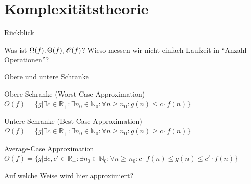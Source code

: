 \def\tutdate{26.01.2017}


\section{Komplexitätstheorie}
\begin{frame}{Rückblick}
	\begin{itemize}
		\pitem Was ist $\Omega(f), \Theta(f), \mathscr{O}(f)$?
		\pitem Wieso messen wir nicht einfach Laufzeit in ``Anzahl Operationen''?
	\end{itemize}
\end{frame}

\begin{frame}{Obere und untere Schranke}
	\begin{block}{Obere Schranke (Worst-Case Approximation)}
		$O(f) = \{g| \exists c \in \mathbb{R}_+ : \exists n_0 \in \mathbb{N}_0: \forall n \geq n_0 : g(n)\leq c \cdot f(n)\}$
	\end{block}
	
	\pause
	
	\begin{block}{Untere Schranke (Best-Case Approximation)}
		$\Omega(f) = \{g| \exists c \in \mathbb{R}_+ : \exists n_0 \in \mathbb{N}_0: \forall n \geq n_0 : g(n)\geq c \cdot f(n)\}$
	\end{block}

	\pause

	\begin{block}{Average-Case Approximation}
		$\Theta(f) = \{g|\exists c, c' \in \mathbb{R}_+ : \exists n_0 \in \mathbb{N}_0: \forall n \geq n_0 : c \cdot f(n) \leq g(n)\leq c' \cdot f(n)\}$
	\end{block}

	\pause
	
	Auf welche Weise wird hier approximiert? %
\end{frame}

